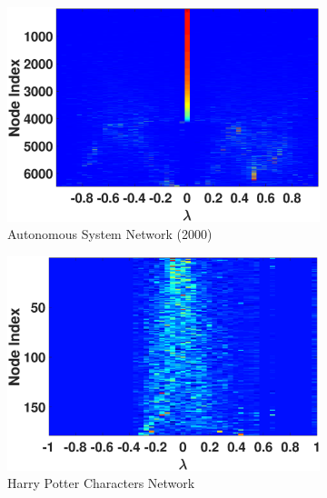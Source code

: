 \begin{figure}[ht]
\begin{subfigure}[t]{0.19\textwidth}
    \includegraphics[width=\textwidth,trim = .4cm 0.5cm 3.5cm 1.3cm,clip]
    {./ndos/pics/as20000102_ldos}
    \caption{Autonomous System Network (2000)}
    \label{fig:as2_ldos}
  \end{subfigure}
  \begin{subfigure}[t]{0.19\textwidth}
    \centering  
    \captionsetup{justification=centering,font=scriptsize}
    \includegraphics[width=\textwidth,trim = .4cm 0.5cm 3.5cm 1.3cm,clip]
    {./ndos/pics/hp_ldos}{}
    \caption{Harry Potter Characters Network}
    \label{fig:hp_ldos}
  \end{subfigure}
  \begin{subfigure}[t]{0.19\textwidth}
    \centering  
    \captionsetup{justification=centering,font=scriptsize}

\end{subfigure}
\end{figure}
